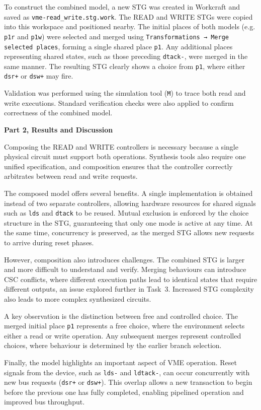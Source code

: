 \documentclass[a4paper,12pt]{article}
\begin{document}
To construct the combined model, a new STG was created in Workcraft and saved as \texttt{vme-read\_write.stg.work}. The READ and WRITE STGs were copied into this workspace and positioned nearby. The initial places of both models (e.g. \texttt{p1r} and \texttt{p1w}) were selected and merged using \texttt{Transformations → Merge selected places}, forming a single shared place \texttt{p1}. Any additional places representing shared states, such as those preceding \texttt{dtack-}, were merged in the same manner. The resulting STG clearly shows a choice from \texttt{p1}, where either \texttt{dsr+} or \texttt{dsw+} may fire.

Validation was performed using the simulation tool (\texttt{M}) to trace both read and write executions. Standard verification checks were also applied to confirm correctness of the combined model.

\textbf{Part 2, Results and Discussion}

Composing the READ and WRITE controllers is necessary because a single physical circuit must support both operations. Synthesis tools also require one unified specification, and composition ensures that the controller correctly arbitrates between read and write requests.

The composed model offers several benefits. A single implementation is obtained instead of two separate controllers, allowing hardware resources for shared signals such as \texttt{lds} and \texttt{dtack} to be reused. Mutual exclusion is enforced by the choice structure in the STG, guaranteeing that only one mode is active at any time. At the same time, concurrency is preserved, as the merged STG allows new requests to arrive during reset phases.

However, composition also introduces challenges. The combined STG is larger and more difficult to understand and verify. Merging behaviours can introduce CSC conflicts, where different execution paths lead to identical states that require different outputs, an issue explored further in Task~3. Increased STG complexity also leads to more complex synthesized circuits.

A key observation is the distinction between free and controlled choice. The merged initial place \texttt{p1} represents a free choice, where the environment selects either a read or write operation. Any subsequent merges represent controlled choices, where behaviour is determined by the earlier branch selection.

Finally, the model highlights an important aspect of VME operation. Reset signals from the device, such as \texttt{lds-} and \texttt{ldtack-}, can occur concurrently with new bus requests (\texttt{dsr+} or \texttt{dsw+}). This overlap allows a new transaction to begin before the previous one has fully completed, enabling pipelined operation and improved bus throughput.
\end{document}
